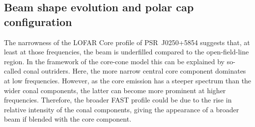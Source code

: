 \subsection{Beam shape evolution and polar cap configuration}
\label{sec: J0250 - discussion - beam shape}

The narrowness of the LOFAR Core profile of PSR~J0250+5854 suggests that, at least at those frequencies, the beam is underfilled compared to the open-field-line region. In the framework of the core-cone model \citep[e.g.][]{Rxxx1983a,Rxxx1983b, RRxx1990, Rxxx1993} this can be explained by so-called conal outriders. Here, the more narrow central core component dominates at low frequencies. However, as the core emission has a steeper spectrum than the wider conal components, the latter can become more prominent at higher frequencies. Therefore, the broader FAST profile could be due to the rise in relative intensity of the conal components, giving the appearance of a broader beam if blended with the core component. 

